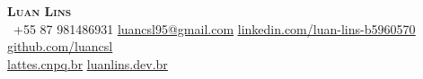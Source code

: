 \begin{center}
    \textbf{\Huge \scshape Luan Lins} \\ \vspace{5pt}
     \ \small +55 87 981486931 \quad
    \href{mailto:luancsl95@gmail.com}{ \underline{luancsl95@gmail.com}} \quad
    \href{https://www.linkedin.com/in/luan-lins-b5960570}{ \underline{linkedin.com/luan-lins-b5960570}} \quad
    \href{https://github.com/}{ \underline{github.com/luancsl}} \quad \\ \vspace{10pt}
    \href{http://lattes.cnpq.br/9321874150400095}{ \underline{lattes.cnpq.br}} \quad
    \href{https://luanlins.dev.br}{ \underline{luanlins.dev.br}}
\end{center}